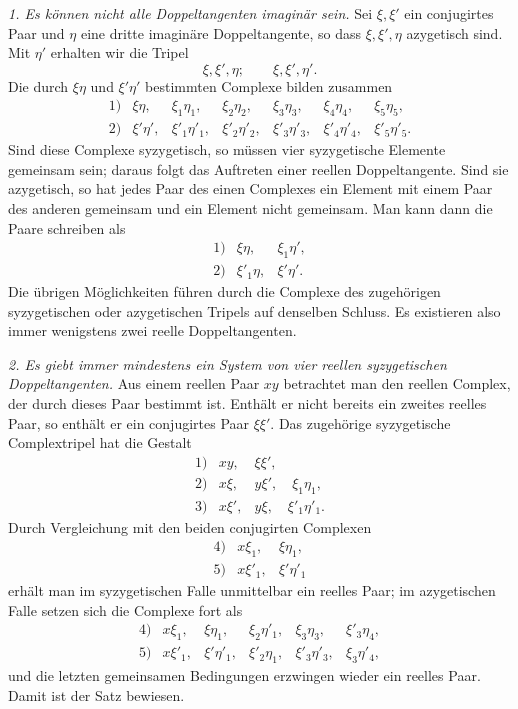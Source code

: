 \documentclass[11pt]{article}
\begin{document}
\emph{1. Es können nicht alle Doppeltangenten imaginär sein.} Sei \(\xi,\xi'\) ein conjugirtes Paar und \(\eta\) eine dritte imaginäre Doppeltangente, so dass \(\xi,\xi',\eta\) azygetisch sind. Mit \(\eta'\) erhalten wir die Tripel
\[
 \xi,\xi',\eta;\qquad \xi,\xi',\eta'.
\]
Die durch \(\xi\eta\) und \(\xi'\eta'\) bestimmten Complexe bilden zusammen
\begin{equation}
\begin{array}{rllllll}
1)&\xi\eta,&\xi_1\eta_1,&\xi_2\eta_2,&\xi_3\eta_3,&\xi_4\eta_4,&\xi_5\eta_5,\\
2)&\xi'\eta',&\xi'_1\eta'_1,&\xi'_2\eta'_2,&\xi'_3\eta'_3,&\xi'_4\eta'_4,&\xi'_5\eta'_5.
\end{array} \tag{1}
\end{equation}
Sind diese Complexe syzygetisch, so müssen vier syzygetische Elemente gemeinsam sein; daraus folgt das Auftreten einer reellen Doppeltangente. Sind sie azygetisch, so hat jedes Paar des einen Complexes ein Element mit einem Paar des anderen gemeinsam und ein Element nicht gemeinsam. Man kann dann die Paare schreiben als
\begin{equation}
\begin{array}{rll}
1)&\xi\eta,&\xi_1\eta',\\
2)&\xi'_1\eta,&\xi'\eta'.
\end{array} \tag{2}
\end{equation}
Die übrigen Möglichkeiten führen durch die Complexe des zugehörigen syzygetischen oder azygetischen Tripels auf denselben Schluss. Es existieren also immer wenigstens zwei reelle Doppeltangenten.

\emph{2. Es giebt immer mindestens ein System von vier reellen syzygetischen Doppeltangenten.} Aus einem reellen Paar \(xy\) betrachtet man den reellen Complex, der durch dieses Paar bestimmt ist. Enthält er nicht bereits ein zweites reelles Paar, so enthält er ein conjugirtes Paar \(\xi\xi'\). Das zugehörige syzygetische Complextripel hat die Gestalt
\[
\begin{array}{rll}
1)&xy,&\xi\xi',\\
2)&x\xi,&y\xi',\quad \xi_1\eta_1,\\
3)&x\xi',&y\xi,\quad \xi'_1\eta'_1.
\end{array}
\]
Durch Vergleichung mit den beiden conjugirten Complexen
\[
\begin{array}{rll}
4)&x\xi_1,&\xi\eta_1,\\
5)&x\xi'_1,&\xi'\eta'_1
\end{array}
\]
erhält man im syzygetischen Falle unmittelbar ein reelles Paar; im azygetischen Falle setzen sich die Complexe fort als
\[
\begin{array}{rllllll}
4)&x\xi_1,&\xi\eta_1,&\xi_2\eta'_1,&\xi_3\eta_3,&\xi'_3\eta_4,\\
5)&x\xi'_1,&\xi'\eta'_1,&\xi'_2\eta_1,&\xi'_3\eta'_3,&\xi_3\eta'_4,
\end{array}
\]
und die letzten gemeinsamen Bedingungen erzwingen wieder ein reelles Paar. Damit ist der Satz bewiesen.
\end{document}
